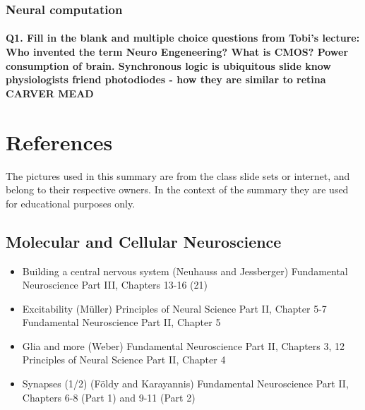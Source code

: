 \documentclass[12pt,article,oneside,a4paper]{memoir}
\begin{document}
\subsubsection{Neural computation}
\paragraph{Q1. Fill in the blank and multiple choice questions from Tobi's lecture: Who invented the term Neuro Engeneering? What is CMOS? Power consumption of brain. Synchronous logic is ubiquitous slide know physiologists friend photodiodes - how they are similar to retina CARVER MEAD}

\newpage

\section{References}
The pictures used in this summary are from the class slide sets or internet, and belong to their respective owners. In the context of the summary they are used for educational purposes only.

\subsection{Molecular and Cellular Neuroscience}
\begin{itemize}
\item Building a central nervous system (Neuhauss and Jessberger)
\subitem Fundamental Neuroscience Part III, Chapters 13-16 (21)
\item Excitability (Müller)
\subitem Principles of Neural Science Part II, Chapter 5-7
\subitem Fundamental Neuroscience Part II, Chapter 5
\item Glia and more (Weber)
\subitem Fundamental Neuroscience Part II, Chapters 3, 12
\subitem Principles of Neural Science Part II, Chapter 4
\item Synapses (1/2) (Földy and Karayannis)
\subitem Fundamental Neuroscience Part II, Chapters 6-8 (Part 1) and 9-11 (Part 2)
\end{itemize}
\end{document}
